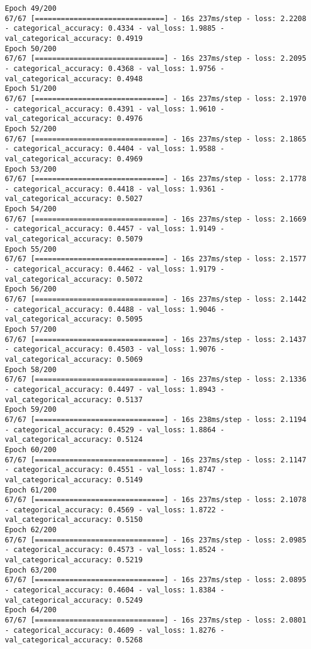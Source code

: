 \begin{lstlisting}
Epoch 49/200
67/67 [==============================] - 16s 237ms/step - loss: 2.2208 - categorical_accuracy: 0.4334 - val_loss: 1.9885 - val_categorical_accuracy: 0.4919
Epoch 50/200
67/67 [==============================] - 16s 237ms/step - loss: 2.2095 - categorical_accuracy: 0.4368 - val_loss: 1.9756 - val_categorical_accuracy: 0.4948
Epoch 51/200
67/67 [==============================] - 16s 237ms/step - loss: 2.1970 - categorical_accuracy: 0.4391 - val_loss: 1.9610 - val_categorical_accuracy: 0.4976
Epoch 52/200
67/67 [==============================] - 16s 237ms/step - loss: 2.1865 - categorical_accuracy: 0.4404 - val_loss: 1.9588 - val_categorical_accuracy: 0.4969
Epoch 53/200
67/67 [==============================] - 16s 237ms/step - loss: 2.1778 - categorical_accuracy: 0.4418 - val_loss: 1.9361 - val_categorical_accuracy: 0.5027
Epoch 54/200
67/67 [==============================] - 16s 237ms/step - loss: 2.1669 - categorical_accuracy: 0.4457 - val_loss: 1.9149 - val_categorical_accuracy: 0.5079
Epoch 55/200
67/67 [==============================] - 16s 237ms/step - loss: 2.1577 - categorical_accuracy: 0.4462 - val_loss: 1.9179 - val_categorical_accuracy: 0.5072
Epoch 56/200
67/67 [==============================] - 16s 237ms/step - loss: 2.1442 - categorical_accuracy: 0.4488 - val_loss: 1.9046 - val_categorical_accuracy: 0.5095
Epoch 57/200
67/67 [==============================] - 16s 237ms/step - loss: 2.1437 - categorical_accuracy: 0.4503 - val_loss: 1.9076 - val_categorical_accuracy: 0.5069
Epoch 58/200
67/67 [==============================] - 16s 237ms/step - loss: 2.1336 - categorical_accuracy: 0.4497 - val_loss: 1.8943 - val_categorical_accuracy: 0.5137
Epoch 59/200
67/67 [==============================] - 16s 238ms/step - loss: 2.1194 - categorical_accuracy: 0.4529 - val_loss: 1.8864 - val_categorical_accuracy: 0.5124
Epoch 60/200
67/67 [==============================] - 16s 237ms/step - loss: 2.1147 - categorical_accuracy: 0.4551 - val_loss: 1.8747 - val_categorical_accuracy: 0.5149
Epoch 61/200
67/67 [==============================] - 16s 237ms/step - loss: 2.1078 - categorical_accuracy: 0.4569 - val_loss: 1.8722 - val_categorical_accuracy: 0.5150
Epoch 62/200
67/67 [==============================] - 16s 237ms/step - loss: 2.0985 - categorical_accuracy: 0.4573 - val_loss: 1.8524 - val_categorical_accuracy: 0.5219
Epoch 63/200
67/67 [==============================] - 16s 237ms/step - loss: 2.0895 - categorical_accuracy: 0.4604 - val_loss: 1.8384 - val_categorical_accuracy: 0.5249
Epoch 64/200
67/67 [==============================] - 16s 237ms/step - loss: 2.0801 - categorical_accuracy: 0.4609 - val_loss: 1.8276 - val_categorical_accuracy: 0.5268

\end{lstlisting}
